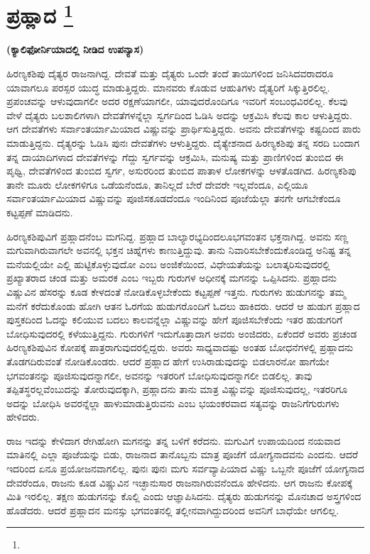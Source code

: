 
\chapter[ಪ್ರಹ್ಲಾದ]{ಪ್ರಹ್ಲಾದ \protect\footnote{}}

\centerline{\textbf{(ಕ್ಯಾಲಿಫೋರ್ನಿಯಾದಲ್ಲಿ ನೀಡಿದ ಉಪನ್ಯಾಸ)}}

ಹಿರಣ್ಯಕಶಿಪು ದೈತ್ಯರ ರಾಜನಾಗಿದ್ದ. ದೇವತೆ ಮತ್ತು ದೈತ್ಯರು ಒಂದೇ ತಂದೆ ತಾಯಿಗಳಿಂದ ಜನಿಸಿದವರಾದರೂ ಯಾವಾಗಲೂ ಪರಸ್ಪರ ಯುದ್ಧ ಮಾಡುತ್ತಿದ್ದರು. ಮಾನವರು ಕೊಡುವ ಆಹುತಿಗಳು ದೈತ್ಯರಿಗೆ ಸಿಕ್ಕುತ್ತಿರಲಿಲ್ಲ. ಪ್ರಪಂಚವನ್ನು ಆಳುವುದಾಗಲೀ ಅದರ ರಕ್ಷಣೆಯಾಗಲೀ, ಯಾವುದರೊಂದಿಗೂ ಇವರಿಗೆ ಸಂಬಂಧವಿರಲಿಲ್ಲ. ಕೆಲವು ವೇಳೆ ದೈತ್ಯರು ಬಲಶಾಲಿಗಳಾಗಿ ದೇವತೆಗಳನ್ನೆಲ್ಲಾ ಸ್ವರ್ಗದಿಂದ ಓಡಿಸಿ ಅದನ್ನು ಆಕ್ರಮಿಸಿ ಕೆಲವು ಕಾಲ ಆಳುತ್ತಿದ್ದರು. ಆಗ ದೇವತೆಗಳು ಸರ್ವಾಂತರ್ಯಾಮಿಯಾದ ವಿಷ್ಣುವನ್ನು ಪ್ರಾರ್ಥಿಸುತ್ತಿದ್ದರು. ಅವನು ದೇವತೆಗಳನ್ನು ಕಷ್ಟದಿಂದ ಪಾರು ಮಾಡುತ್ತಿದ್ದನು. ದೈತ್ಯರನ್ನು ಓಡಿಸಿ ಪುನಃ ದೇವತೆಗಳು ಆಳುತ್ತಿದ್ದರು. ದೈತ್ಯೇಶನಾದ ಹಿರಣ್ಯಕಶಿಪು ತನ್ನ ಸರದಿ ಬಂದಾಗ ತನ್ನ ದಾಯಾದಿಗಳಾದ ದೇವತೆಗಳನ್ನು ಗೆದ್ದು ಸ್ವರ್ಗವನ್ನು ಆಕ್ರಮಿಸಿ, ಮನುಷ್ಯ ಮತ್ತು ಪ್ರಾಣಿಗಳಿಂದ ತುಂಬಿದ ಈ ಪೃಥ್ವಿ, ದೇವತೆಗಳಿಂದ ತುಂಬಿದ ಸ್ವರ್ಗ, ಅಸುರರಿಂದ ತುಂಬಿದ ಪಾತಾಳ ಲೋಕಗಳನ್ನು ಆಳತೊಡಗಿದ. ಹಿರಣ್ಯಕಶಿಪು ತಾನೇ ಮೂರು ಲೋಕಗಳಿಗೂ ಒಡೆಯನೆಂದೂ, ತಾನಿಲ್ಲದೆ ಬೇರೆ ದೇವರೇ ಇಲ್ಲವೆಂದೂ, ಎಲ್ಲಿಯೂ ಸರ್ವಾಂತರ್ಯಾಮಿಯಾದ ವಿಷ್ಣುವನ್ನು ಪೂಜಿಸಕೂಡದೆಂದೂ ಇಂದಿನಿಂದ ಪೂಜೆಯೆಲ್ಲಾ ತನಗೇ ಆಗಬೇಕೆಂದೂ ಕಟ್ಟಪ್ಪಣೆ ಮಾಡಿದನು.

ಹಿರಣ್ಯಕಶಿಪುವಿಗೆ ಪ್ರಹ್ಲಾದನೆಂಬ ಮಗನಿದ್ದ. ಪ್ರಹ್ಲಾದ ಬಾಲ್ಯಾರಭ್ಯದಿಂದಲೂ\break ಭಗವಂತನ ಭಕ್ತನಾಗಿದ್ದ. ಅವನು ಸಣ್ಣ ಮಗುವಾಗಿರುವಾಗಲೇ ಅವನಲ್ಲಿ ಭಕ್ತನ ಚಿಹ್ನೆಗಳು ಕಾಣುತ್ತಿದ್ದುವು. ತಾನು ನಿವಾರಿಸಬೇಕೆಂದುಕೊಂಡಿದ್ದ ಅನಿಷ್ಟ ತನ್ನ ಮನೆಯಲ್ಲಿಯೇ ಎಲ್ಲಿ ಹುಟ್ಟಿಕೊಳ್ಳುವುದೋ ಎಂಬ ಅಂಜಿಕೆಯಿಂದ, ವಿಧೇಯತೆಯನ್ನು ಬಲಾತ್ಕರಿಸುವುದರಲ್ಲಿ ಪ್ರಖ್ಯಾತರಾದ ಚಂಡ ಮತ್ತು ಅಮರಕ ಎಂಬ ಇಬ್ಬರು ಗುರುಗಳ ಅಧೀನಕ್ಕೆ ಮಗನನ್ನು ಒಪ್ಪಿಸಿದನು. ಪ್ರಹ್ಲಾದನು ವಿಷ್ಣುವಿನ ಹೆಸರನ್ನು ಕೂಡ ಕೇಳದಂತೆ ನೋಡಿಕೊಳ್ಳಬೇಕೆಂದು ಕಟ್ಟಪ್ಪಣೆ ಇತ್ತನು. ಗುರುಗಳು ಹುಡುಗನನ್ನು ತಮ್ಮ ಮನೆಗೆ ಕರೆದುಕೊಂಡು ಹೋಗಿ ಆತನ ಓರಗೆಯ ಹುಡುಗರೊಂದಿಗೆ ಓದಲು ಹಾಕಿದರು. ಆದರೆ ಆ ಹುಡುಗ ಪ್ರಹ್ಲಾದ ಪುಸ್ತಕದಿಂದ ಓದನ್ನು ಕಲಿಯುವ ಬದಲು ಕಾಲವನ್ನೆಲ್ಲಾ ವಿಷ್ಣುವನ್ನು ಹೇಗೆ ಪೂಜಿಸಬೇಕೆಂದು ಇತರ ಹುಡುಗರಿಗೆ ಬೋಧಿಸುವುದರಲ್ಲಿ ಕಳೆಯುತ್ತಿದ್ದನು. ಗುರುಗಳಿಗೆ ಇದು\break ಗೊತ್ತಾದಾಗ ಅವರು ಅಂಜಿದರು, ಏಕೆಂದರೆ ಅವರು ಪ್ರಚಂಡ ಹಿರಣ್ಯಕಶಿಪುವಿನ ಕೋಪಕ್ಕೆ ಪಾತ್ರರಾಗುವುದರಲ್ಲಿದ್ದರು. ಅವರು ಸಾಧ್ಯವಾದಷ್ಟು ಅಂತಹ ಬೋಧನೆಗಳಲ್ಲಿ ಪ್ರಹ್ಲಾದನು ತೊಡಗದಿರುವಂತೆ ನೋಡಿಕೊಂಡರು. ಆದರೆ ಪ್ರಹ್ಲಾದ ಹೇಗೆ ಉಸಿರಾಡುವುದನ್ನು ಬಿಡಲಾರನೋ ಹಾಗೆಯೇ ಭಗವಂತನನ್ನು ಪೂಜಿಸುವುದನ್ನಾಗಲೀ, ಅವನನ್ನು ಇತರರಿಗೆ ಬೋಧಿಸುವುದನ್ನಾಗಲೀ ಬಿಡಲಿಲ್ಲ. ತಾವು ತಪ್ಪಿತಸ್ಥರಲ್ಲವೆಂಬುದನ್ನು ತೋರುವುದಕ್ಕಾಗಿ, ಪ್ರಹ್ಲಾದನು ತಾನು ಮಾತ್ರ ವಿಷ್ಣುವನ್ನು ಪೂಜಿಸುವುದಲ್ಲ, ಇತರರಿಗೂ ಅದನ್ನು ಬೋಧಿಸಿ ಅವರನ್ನೆಲ್ಲಾ ಹಾಳುಮಾಡುತ್ತಿರುವನು ಎಂಬ ಭಯಂಕರವಾದ ಸತ್ಯವನ್ನು ರಾಜನಿಗೆ\break ಗುರುಗಳು ಹೇಳಿದರು.

\vskip 0.3cm

ರಾಜ ಇದನ್ನು ಕೇಳಿದಾಗ ರೇಗಿಹೋಗಿ ಮಗನನ್ನು ತನ್ನ ಬಳಿಗೆ ಕರೆದನು. ಮಗುವಿಗೆ ಉಪಾಯದಿಂದ ನಯವಾದ ಮಾತಿನಲ್ಲಿ ಎಲ್ಲಾ ಪೂಜೆಯನ್ನು ಬಿಡು, ರಾಜನಾದ ತಾನೊಬ್ಬನು ಮಾತ್ರ ಪೂಜೆಗೆ ಯೋಗ್ಯನಾದವನು ಎಂದನು. ಆದರೆ ಇದರಿಂದ ಏನೂ ಪ್ರಯೋಜನವಾಗಲಿಲ್ಲ. ಪುನಃ ಪುನಃ ಮಗು ಸರ್ವವ್ಯಾಪಿಯಾದ ವಿಷ್ಣು ಒಬ್ಬನೇ ಪೂಜೆಗೆ ಯೋಗ್ಯನಾದ ದೇವರೆಂದೂ, ರಾಜನು ಕೂಡ ವಿಷ್ಣುವಿನ ಇಚ್ಛಾನುಸಾರ ರಾಜನಾಗಿರುವನೆಂದೂ ಹೇಳಿದನು. ಆಗ ರಾಜನು ಕೋಪಕ್ಕೆ ಮಿತಿ ಇರಲಿಲ್ಲ. ತಕ್ಷಣ ಹುಡುಗನನ್ನು ಕೊಲ್ಲಿ ಎಂದು ಆಜ್ಞಾಪಿಸಿದನು. ದೈತ್ಯರು ಹುಡುಗನನ್ನು ಮೊನಚಾದ ಅಸ್ತ್ರಗಳಿಂದ ಹೊಡೆದರು. ಆದರೆ ಪ್ರಹ್ಲಾದನ ಮನಸ್ಸು ಭಗವಂತನಲ್ಲಿ ತಲ್ಲೀನವಾಗಿದ್ದುದರಿಂದ ಅವನಿಗೆ ಬಾಧೆಯೇ ಆಗಲಿಲ್ಲ.

